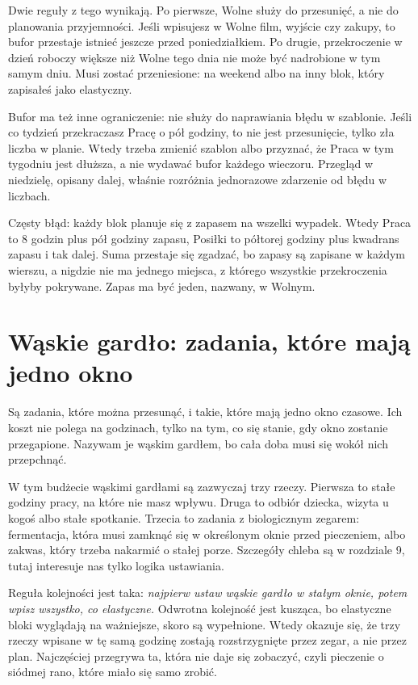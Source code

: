 Dwie reguły z tego wynikają. Po pierwsze, Wolne służy do przesunięć, a nie do planowania przyjemności. Jeśli wpisujesz w Wolne film, wyjście czy zakupy, to bufor przestaje istnieć jeszcze przed poniedziałkiem. Po drugie, przekroczenie w dzień roboczy większe niż Wolne tego dnia nie może być \glqq nadrobione\grqq{} w tym samym dniu. Musi zostać przeniesione: na weekend albo na inny blok, który zapisałeś jako elastyczny.

Bufor ma też inne ograniczenie: nie służy do naprawiania błędu w szablonie. Jeśli co tydzień przekraczasz Pracę o pół godziny, to nie jest przesunięcie, tylko zła liczba w planie. Wtedy trzeba zmienić szablon albo przyznać, że Praca w tym tygodniu jest dłuższa, a nie wydawać bufor każdego wieczoru. Przegląd w niedzielę, opisany dalej, właśnie rozróżnia jednorazowe zdarzenie od błędu w liczbach.

\begin{falle}
Częsty błąd: każdy blok planuje się z zapasem \glqq na wszelki wypadek\grqq{}. Wtedy Praca to 8 godzin plus pół godziny zapasu, Posiłki to półtorej godziny plus kwadrans zapasu i tak dalej. Suma przestaje się zgadzać, bo zapasy są zapisane w każdym wierszu, a nigdzie nie ma jednego miejsca, z którego wszystkie przekroczenia byłyby pokrywane. Zapas ma być jeden, nazwany, w Wolnym.
\end{falle}

\section{Wąskie gardło: zadania, które mają jedno okno}

Są zadania, które można przesunąć, i takie, które mają jedno okno czasowe. Ich koszt nie polega na godzinach, tylko na tym, co się stanie, gdy okno zostanie przegapione. Nazywam je wąskim gardłem, bo cała doba musi się wokół nich przepchnąć.

W tym budżecie wąskimi gardłami są zazwyczaj trzy rzeczy. Pierwsza to stałe godziny pracy, na które nie masz wpływu. Druga to odbiór dziecka, wizyta u kogoś albo stałe spotkanie. Trzecia to zadania z biologicznym zegarem: fermentacja, która musi zamknąć się w określonym oknie przed pieczeniem, albo zakwas, który trzeba nakarmić o stałej porze. Szczegóły chleba są w rozdziale 9, tutaj interesuje nas tylko logika ustawiania.

Reguła kolejności jest taka: \emph{najpierw ustaw wąskie gardło w stałym oknie, potem wpisz wszystko, co elastyczne.} Odwrotna kolejność jest kusząca, bo elastyczne bloki wyglądają na ważniejsze, skoro są wypełnione. Wtedy okazuje się, że trzy rzeczy wpisane w tę samą godzinę zostają rozstrzygnięte przez zegar, a nie przez plan. Najczęściej przegrywa ta, która nie daje się zobaczyć, czyli pieczenie o siódmej rano, które \glqq miało się samo\grqq{} zrobić.

